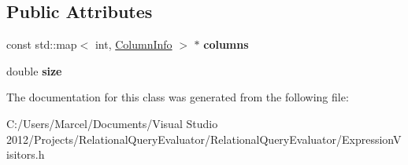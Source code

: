 \subsection*{Public Attributes}
\begin{DoxyCompactItemize}
\item 
\hypertarget{class_size_estimating_expression_visitor_ac3830138167760ff403ad52bd606a560}{const std\+::map$<$ int, \hyperlink{class_column_info}{Column\+Info} $>$ $\ast$ {\bfseries columns}}\label{class_size_estimating_expression_visitor_ac3830138167760ff403ad52bd606a560}

\item 
\hypertarget{class_size_estimating_expression_visitor_a882681f529d9c9cb182ad76a1734921e}{double {\bfseries size}}\label{class_size_estimating_expression_visitor_a882681f529d9c9cb182ad76a1734921e}

\end{DoxyCompactItemize}


The documentation for this class was generated from the following file\+:\begin{DoxyCompactItemize}
\item 
C\+:/\+Users/\+Marcel/\+Documents/\+Visual Studio 2012/\+Projects/\+Relational\+Query\+Evaluator/\+Relational\+Query\+Evaluator/Expression\+Visitors.\+h\end{DoxyCompactItemize}
